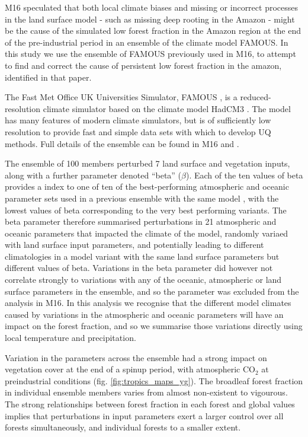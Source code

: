 \documentclass[gmd, manuscript]{copernicus}
\begin{document}
M16 speculated that both local climate biases and missing or incorrect processes in the land surface model - such as missing deep rooting in the Amazon - might be the cause of the simulated low forest fraction in the Amazon region at the end of the pre-industrial period in an ensemble of the climate model FAMOUS. In this study we use the ensemble of FAMOUS previously used in M16, to attempt to find and correct the cause of persistent low forest fraction in the amazon, identified in that paper. 

The Fast Met Office UK Universities Simulator, FAMOUS \citep{jones2005systematic, smith2008famous}, is a reduced-resolution climate simulator based on the climate model HadCM3 \citep{gordon2000simulation, pope2000impact}. The model has many features of modern climate simulators, but is of sufficiently low resolution to provide fast and simple data sets with which to develop UQ methods. Full details of the ensemble can be found in M16 and \cite{williams2013optimising}.

The ensemble of 100 members perturbed 7 land surface and vegetation inputs, along with a further parameter denoted ``beta'' ($\beta$). Each of the ten values of beta provides a index to one of ten of the best-performing atmospheric and oceanic parameter sets used in a previous ensemble with the same model \cite{gregoire2010optimal}, with the lowest values of beta corresponding to the very best performing variants. The beta parameter therefore summarised perturbations in 21 atmospheric and oceanic parameters that impacted the climate of the model, randomly variaed with land surface input parameters, and potentially leading to different climatologies in a model variant with the same land surface parameters but different values of beta. Variations in the beta parameter did however not correlate strongly to variations with any of the oceanic, atmospheric or land surface parameters in the ensemble, and so the parameter was excluded from the analysis in M16. In this analysis we recognise that the different model climates caused by variations in the atmospheric and oceanic parameters will have an impact on the forest fraction, and so we summarise those variations directly using local temperature and precipitation.

Variation in the parameters across the ensemble had a strong impact on vegetation cover at the end of a spinup period, with atmospheric CO$_2$ at preindustrial conditions (fig. \ref{fig:tropics_maps_yg}). The broadleaf forest fraction in individual ensemble members varies from almost non-existent to vigourous. The strong relationships between forest fraction in each forest and global values implies that perturbations in input parameters exert a larger control over all forests simultaneously, and individual forests to a smaller extent.
\end{document}
